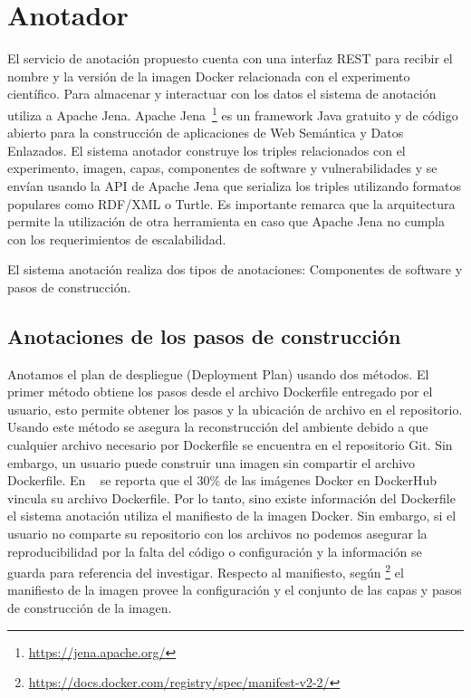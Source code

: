 \section{Anotador}\label{s4.2}

El servicio de anotación propuesto cuenta con una interfaz REST para recibir el nombre y la versión de la imagen Docker relacionada con el experimento científico. 
Para almacenar y interactuar con los datos el sistema de anotación utiliza a Apache Jena. Apache Jena~\footnote{\url{https://jena.apache.org/}} es un framework Java gratuito y de código abierto para la construcción de aplicaciones de Web Semántica y Datos Enlazados. El sistema anotador construye los triples relacionados con el experimento, imagen, capas, componentes de software y vulnerabilidades y se envían usando la API de Apache Jena que serializa los triples utilizando formatos populares como RDF/XML o Turtle.
Es importante remarca que la arquitectura permite la utilización de otra herramienta en caso que Apache Jena no cumpla con los requerimientos de escalabilidad.

El sistema anotación realiza dos tipos de anotaciones: Componentes de software y pasos de construcción.


\subsection{Anotaciones de los pasos de construcción}\label{s4.2.1}

Anotamos el plan de despliegue (Deployment Plan) usando dos métodos. El primer método obtiene los pasos desde el archivo Dockerfile entregado por el usuario, esto permite obtener los pasos y la ubicación de archivo en el repositorio. 
Usando este método se asegura la reconstrucción del ambiente debido a que cualquier archivo necesario por Dockerfile se encuentra en el repositorio Git.
Sin embargo, un usuario puede construir una imagen sin compartir el archivo Dockerfile. En ~\cite{DBLP:conf/semweb/OsorioAV18a} se reporta que el 30\% de las imágenes Docker en DockerHub vincula su archivo Dockerfile. 
Por lo tanto, sino existe información del Dockerfile el sistema anotación utiliza el manifiesto de la imagen Docker. Sin embargo, si el usuario no comparte su repositorio con los archivos no podemos asegurar la reproducibilidad por la falta del código o configuración y la información se guarda para referencia del investigar.
Respecto al manifiesto,  según \footnote{\url{https://docs.docker.com/registry/spec/manifest-v2-2/}} el manifiesto de la imagen provee la configuración y el conjunto de las capas y pasos de construcción de la imagen.
 
